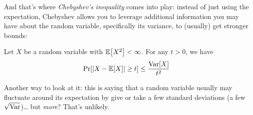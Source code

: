 And that's where \emph{Chebyshev's inequality} comes into play: instead of just using the expectation, Chebyshev allows you to leverage additional information you may have about the random variable, specifically its variance, to (usually) get stronger bounds:
\begin{theorem}
Let $X$ be a random variable with $\bEE{X^2} < \infty$. For any $t > 0$, we have
\[  
  \bPr{ \abs{X-\bEE{X}} \geq t } \leq \frac{\var[X]}{t^2}
\]
\end{theorem}
Another way to look at it: this is saying that a random variable usually may fluctuate around its expectation by give or take a few standard deviations (\ie a few $\sqrt{\operatorname{Var}}$)\dots{} but \emph{more}? That's unlikely. 


